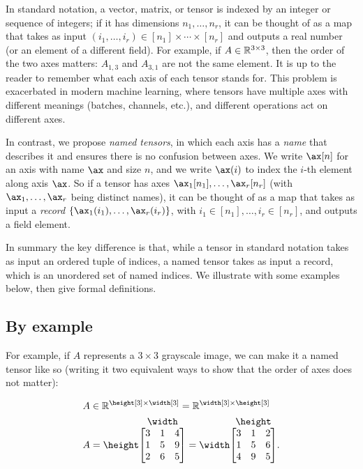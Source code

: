 In standard notation, a vector, matrix, or tensor is indexed by an integer or sequence of integers; if it has dimensions $n_1,\ldots,n_r$, it can be thought of as a map that takes as input $(i_1,\ldots,i_r) \in [n_1]\times \cdots \times [n_r]$ and outputs a real number (or an element of a different field).
For example, if $A \in \mathbb{R}^{3\times3}$, then the order of the two axes matters: $A_{1,3}$ and $A_{3,1}$ are not the same element. It is up to the reader to remember what each axis of each tensor stands for. This problem is exacerbated in modern machine learning, where tensors have multiple axes with different meanings (batches, channels, etc.), and different operations act on different axes. 

In contrast, we propose \emph{named tensors}, in which each axis has a \emph{name} that describes it and ensures there is no confusion between axes.
We write $\ax[n]$ for an axis with name $\ax$ and size $n$, and we write $\ax(i)$ to index the $i$-th element along axis $\ax$.
So if a tensor has axes $\ax_1[n_1],\ldots,\ax_r[n_r]$ (with $\ax_1,\ldots, \ax_r$ being distinct names), it can be thought of as a map that takes as input a \emph{record} $\{ \ax_1(i_1) ,\ldots, \ax_r(i_r) \}$, with $i_1 \in [n_1], \ldots, i_r \in [n_r]$, and outputs a field element.

In summary the key difference is that, while a tensor in standard notation takes as input an ordered tuple of indices, a named tensor takes as input a record, which is an unordered set of named indices. We illustrate with some examples below, then give formal definitions.

\subsection{By example} \label{sec:example}

For example, if $A$ represents a $3\times 3$ grayscale image, we can make it a named tensor like so (writing it two equivalent ways to show that the order of axes does not matter):

\begin{align}
  A &\in \reals^{\height[3] \times \width[3]} = \reals^{\width[3] \times \height[3]} \notag \\
  A &= \nmatrix{\height}{\width}{
    3 & 1 & 4 \\
    1 & 5 & 9 \\
    2 & 6 & 5
  } = \nmatrix{\width}{\height}{
    3 & 1 & 2 \\
    1 & 5 & 6 \\
    4 & 9 & 5
  }. \label{eq:example_tensor}
\end{align}


